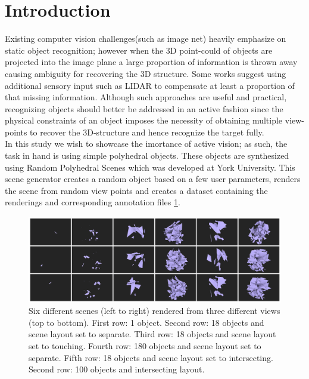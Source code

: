 \documentclass[crop=false]{standalone}
\begin{document}
\section{Introduction}
Existing computer vision challenges(such as image net\cite{deng2009imagenet}) heavily emphasize on static object recognition; however when the 3D point-could of objects are projected into the image plane a large proportion of information is thrown away causing ambiguity for recovering the 3D structure. Some works suggest using additional sensory input such as LIDAR to compensate at least a proportion of that missing information. Although such approaches are useful and practical, recognizing objects should better be addressed in an active fashion since the physical constraints of an object imposes the necessity of obtaining multiple view-points to recover the 3D-structure and hence recognize the target fully. 
\\

\noindent In this study we wish to showcase the imortance of active vision; as such, the task in hand is using simple polyhedral objects. These objects are synthesized using Random Polyhedral Scenes \cite{2018arXiv180310100S} which was developed at York University. This scene generator creates a random object based on a few user parameters, renders the scene from random view points and creates a dataset containing the renderings and corresponding annotation files \ref{fig:RPS}.

\begin{figure}[t]
\centering
\includegraphics[width=1\columnwidth]{figure/poly1.png}
\caption{Six different scenes (left to right) rendered from three different views (top to bottom). First row: 1 object. Second row: 18 objects and scene layout set to separate. Third row: 18 objects and scene layout set to touching. Fourth row: 180 objects and scene layout set to separate. Fifth row: 18 objects and scene layout set to intersecting. Second row: 100 objects and intersecting layout.}
\label{fig:RPS}
\end{figure}
\end{document}
